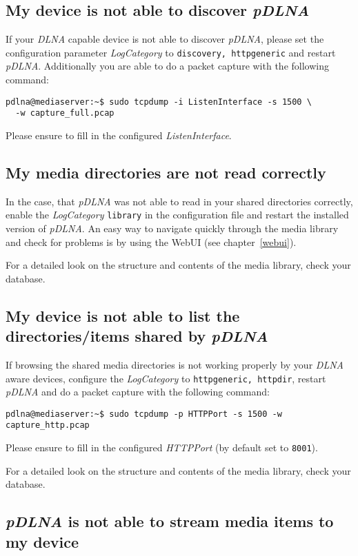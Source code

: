 \subsection{My device is not able to discover {\em pDLNA}}

If your {\em DLNA} capable device is not able to discover {\em pDLNA}, please set the configuration parameter {\em LogCategory} to \verb|discovery, httpgeneric| and restart {\em pDLNA}. Additionally you are able to do a packet capture with the following command:
\begin{lstlisting}
pdlna@mediaserver:~$ sudo tcpdump -i ListenInterface -s 1500 \
  -w capture_full.pcap
\end{lstlisting}
Please ensure to fill in the configured {\em ListenInterface}.

\subsection{My media directories are not read correctly}

In the case, that {\em pDLNA} was not able to read in your shared directories correctly, enable the {\em LogCategory} \verb|library| in the configuration file and restart the installed version of {\em pDLNA}. An easy way to navigate quickly through the media library and check for problems is by using the WebUI (see chapter~\ref{webui}).

For a detailed look on the structure and contents of the media library, check your database.

\subsection{My device is not able to list the directories/items shared by {\em pDLNA}}

If browsing the shared media directories is not working properly by your {\em DLNA} aware devices, configure the {\em LogCategory} to \verb|httpgeneric, httpdir|, restart {\em pDLNA} and do a packet capture with the following command:
\begin{lstlisting}
pdlna@mediaserver:~$ sudo tcpdump -p HTTPPort -s 1500 -w capture_http.pcap
\end{lstlisting}
Please ensure to fill in the configured {\em HTTPPort} (by default set to \verb|8001|).

For a detailed look on the structure and contents of the media library, check your database.

\subsection{{\em pDLNA} is not able to stream media items to my device}

